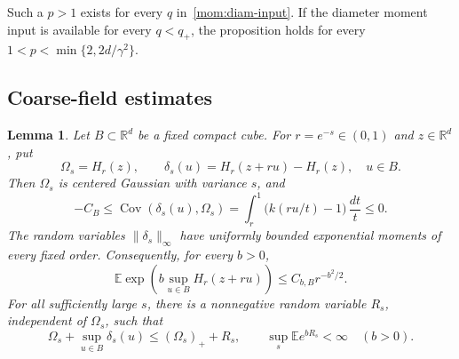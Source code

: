 \documentclass[11pt,letterpaper]{article}
\newcommand{\R}{\mathbb R}
\newcommand{\E}{\mathbb E}
\newtheorem{lemma}[theorem]{Lemma}
\theoremstyle{definition}
\theoremstyle{remark}
\numberwithin{equation}{section}
\begin{document}
Such a $p>1$ exists for every $q$ in~\eqref{mom:diam-input}.  If the diameter moment input is available for every $q<q_+$, the proposition holds for every $1<p<\min\{2,2d/\gamma^2\}$.

\subsection{Coarse-field estimates}

\begin{lemma}\label{mom:coarse}
Let $B\subset\R^d$ be a fixed compact cube.  For $r=e^{-s}\in(0,1)$ and $z\in\R^d$, put
\begin{equation*}
 \Omega_s=H_r(z),\qquad
 \delta_s(u)=H_r(z+ru)-H_r(z),\quad u\in B.
\end{equation*}
Then $\Omega_s$ is centered Gaussian with variance $s$, and
\begin{equation}\label{mom:coarse-cov}
 -C_B\le
 \operatorname{Cov}(\delta_s(u),\Omega_s)
 =\int_r^1\bigl(k(ru/t)-1\bigr)\,\frac{dt}{t}
 \le0.
\end{equation}
The random variables $\|\delta_s\|_\infty$ have uniformly bounded exponential moments of every fixed order.  Consequently, for every $b>0$,
\begin{equation}\label{mom:coarse-tilt}
 \E\exp\!\left(b\sup_{u\in B}H_r(z+ru)\right)
 \le C_{b,B}r^{-b^2/2}.
\end{equation}
For all sufficiently large $s$, there is a nonnegative random variable $R_s$, independent of $\Omega_s$, such that
\begin{equation}\label{mom:positive-part}
 \Omega_s+\sup_{u\in B}\delta_s(u)
 \le(\Omega_s)_++R_s,
 \qquad
 \sup_s\E e^{bR_s}<\infty\quad(b>0).
\end{equation}
\end{lemma}
\end{document}
